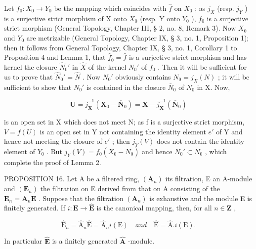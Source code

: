 Let \(f_{0}: X_{0} \to Y_{0}\) be the mapping which coincides with \(\hat{f}\) on \(X_{0}\) ; as \(j_{X}\) (resp. \(j_{Y}\) ) is a surjective strict morphism of X onto \(X_{0}\) (resp. Y onto \(Y_{0}\) ), \(f_{0}\) is a surjective strict morphism (General Topology, Chapter III, § 2, no. 8, Remark 3). Now \(X_{0}\) and \(Y_{0}\) are metrizable (General Topology, Chapter IX, § 3, no. 1, Proposition 1); then it follows from General Topology, Chapter IX, § 3, no. 1, Corollary 1 to Proposition 4 and Lemma 1, that \(\hat{f}_{0} = \hat{f}\) is a surjective strict morphism and has kernel the closure \(\hat{N}_{0}'\) in \(\hat{X}\) of the kernel \(N_{0}'\) of \(f_{0}\) . Then it will be sufficient for us to prove that \(\hat{N}_{0}' = \hat{N}\) . Now \(N_{0}'\) obviously contains \(N_{0} = j_{X}(N)\) ; it will be sufficient to show that \(N_{0}'\) is contained in the closure \(\bar{N}_{0}\) of \(N_{0}\) in X. Now,

\[
\mathbf {U} = \bar {j} _ {\mathbf {X}} ^ {- 1} (\mathbf {X} _ {0} - \overline {{\mathbf {N}}} _ {0}) = \mathbf {X} - \bar {j} _ {\mathbf {X}} ^ {- 1} (\overline {{\mathbf {N}}} _ {0})
\]

is an open set in X which does not meet N; as f is a surjective strict morphism, \(V = f(U)\) is an open set in Y not containing the identity element \(e'\) of Y and hence not meeting the closure of \(e'\) ; then \(j_{Y}(V)\) does not contain the identity element of \(Y_{0}\) . But \(j_{Y}(V) = f_{0}(X_{0} - \overline{N}_{0})\) and hence \(N_{0}' \subset \overline{N}_{0}\) , which complete the proof of Lemma 2.

PROPOSITION 16. Let A be a filtered ring, \((\mathbf{A}_n)\) its filtration, E an A-module and \((\mathbf{E}_n)\) the filtration on E derived from that on A consisting of the \(\mathbf{E}_n = \mathbf{A}_n\mathbf{E}\) . Suppose that the filtration \((\mathbf{A}_n)\) is exhaustive and the module E is finitely generated. If \(i: \mathbf{E} \to \hat{\mathbf{E}}\) is the canonical mapping, then, for all \(n \in \mathbf{Z}\) ,

\[
\hat {\mathrm{E}} _ {n} = \hat {\mathrm{A}} _ {n} \hat {\mathrm{E}} = \hat {\mathrm{A}} _ {n} i (\mathrm{E}) \quad a n d \quad \hat {\mathrm{E}} = \hat {\mathrm{A}}. i (\mathrm{E}).\tag{25}
\]

In particular \(\hat{\mathbf{E}}\) is a finitely generated \(\hat{\mathbf{A}}\) -module.

